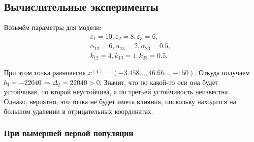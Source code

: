 \subsection{Вычислительные эксперименты}
    Возьмём параметры для модели:
    \[
        \begin{split}
            & \varepsilon_1 = 10, \varepsilon_2 = 8, \varepsilon_3 = 6, \\
            & \alpha_{12} = 6, \alpha_{13} = 2, \alpha_{23} = 0.5, \\
            & k_{12} = 4, k_{13} = 1, k_{23} = 0.5.
        \end{split}
    \]

    При этом точка равновесия \( x^{(4)} = ( -3.458\dots, 46.66\dots, -150 ) \). Откуда получаем \( b_3 = -22040 \Rightarrow \Delta_2 = 22040 > 0 \). Значит, что по какой-то оси она будет устойчивая, по второй неустойчива, а по третьей устойчивость неизвестна. Однако, вероятно, это точка не будет иметь влияния, поскольку находится на большом удалении в отрицательных координатах.

    \subsubsection{При вымершей первой популяции}

